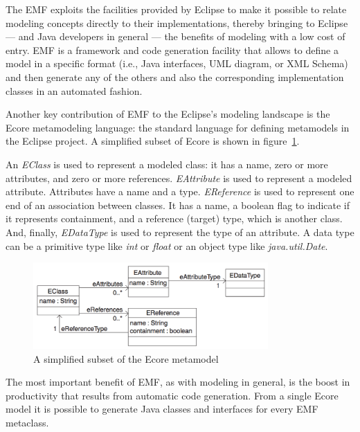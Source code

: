 \documentclass[
	10pt,				%
	oneside,
	a4paper,			%
	brazil,
	english
	]{abntex2}
\begin{document}
The EMF exploits the facilities provided by Eclipse to make it possible to relate
modeling concepts directly to their implementations, thereby bringing to Eclipse
— and Java developers in general — the benefits of modeling with a low cost of entry.
%
EMF is a framework and code generation facility that allows to define a model in
a specific format (i.e., Java interfaces, UML diagram, or XML Schema) and then
generate any of the others and also the corresponding implementation classes in
an automated fashion.

Another key contribution of EMF to the Eclipse's modeling landscape is the Ecore
metamodeling language: the standard language for defining metamodels in
the Eclipse project. A simplified subset of Ecore is shown in figure~\ref{fig:ecore_fragment}.

An \emph{EClass} is used to represent a modeled class: it has a name, zero or more
attributes, and zero or more references.
\emph{EAttribute} is used to represent a modeled attribute. Attributes have a
name and a type.
\emph{EReference} is used to represent one end of an association between classes.
It has a name, a boolean flag to indicate if it represents containment, and a
reference (target) type, which is another class.
And, finally, \emph{EDataType} is used to represent the type of an attribute.
A data type can be a primitive type like \emph{int} or \emph{float} or an object
type like \emph{java.util.Date}.

\begin{figure}
\includegraphics[width=0.8\textwidth]{images/ecore_fragment}
\caption{A simplified subset of the Ecore metamodel \protect\cite{budinsky09}}
\label{fig:ecore_fragment}
\end{figure}


The most important benefit of EMF, as with modeling in general, is the boost in
productivity that results from automatic code generation. From a single Ecore
model it is possible to generate Java classes and interfaces for every EMF metaclass.
\end{document}
